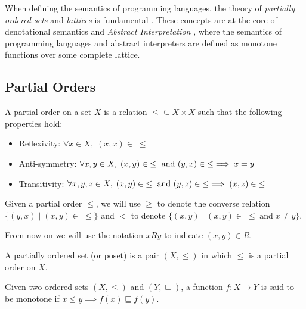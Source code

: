 \documentclass[
  10pt,       %
  twoside,    %
  a4paper,    %
  english,    %
  tikz,       %
  openright,  %
]{book}
\begin{document}
When defining the semantics of programming languages, the theory of 
\textit{partially ordered sets} and \textit{lattices} is fundamental
\cite{Gratzer11, Birkhoff40}. These 
concepts are at the core of denotational semantics \cite{Scott70} and 
\textit{Abstract Interpretation} \cite{Cousot77}, where the semantics of 
programming languages and abstract interpreters are defined as monotone 
functions over some complete lattice.

\subsection{Partial Orders}

\begin{definition}
  A partial order on a set $X$ is a relation $\leq \subseteq X \times X$ 
  such that the following properties hold:
  \begin{itemize}
    \item Reflexivity: $\forall x \in X, \; (x, x) \in \; \leq$
    \item Anti-symmetry: $\forall x, y \in X, \; (x, y) \in \; \leq \text{ and }
      (y, x) \in \; \leq \implies x = y$
    \item Transitivity: $\forall x, y, z \in X, \; (x, y) \in \; \leq \text{ and } 
      (y, z) \in \; \leq \implies (x, z) \in \;\leq$
  \end{itemize}
    
\end{definition}

Given a partial order $\leq$, we will use $\geq$ to denote the converse 
relation $\{ (y, x) \mid (x, y) \in \;\leq \}$ and $<$ to denote 
$\{ (x, y) \mid (x, y) \in \;\leq \; \text{and} \; x \neq y \}$.

From now on we will use the notation $x R y$ to indicate $(x, y) \in R$.

\begin{definition}
  A partially ordered set (or poset) is a pair $(X, \leq)$ in which $\leq$ is a 
  partial order on $X$.
\end{definition}

\begin{definition}
  Given two ordered sets $(X, \leq)$ and $(Y, \sqsubseteq)$, a function 
  $f : X \to Y$ is said to be monotone if $x \leq y \implies f(x) \sqsubseteq 
  f(y)$.
\end{definition}
\end{document}
